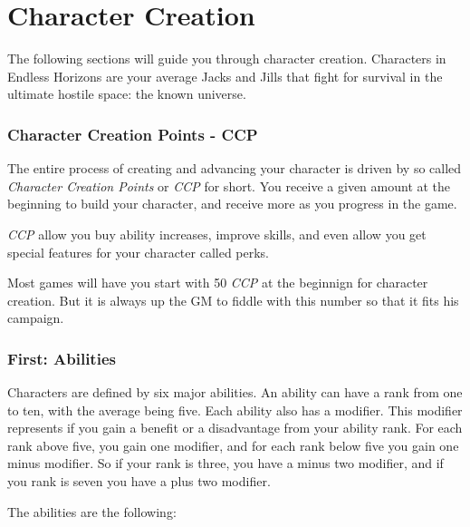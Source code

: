 \chapter{Character Creation}

The following sections will guide you through character creation. Characters
in Endless Horizons are your average Jacks and Jills that fight for survival
in the ultimate hostile space: the known universe.

\subsection{Character Creation Points - CCP}

The entire process of creating and advancing your character is driven by so
called \emph{Character Creation Points} or \emph{CCP} for short. You receive
a given amount at the beginning to build your character, and receive more as
you progress in the game.

\emph{CCP} allow you buy ability increases, improve skills, and even allow you
get special features for your character called perks.

Most games will have you start with 50 \emph{CCP} at the beginnign for character
creation. But it is always up the GM to fiddle with this number so that it fits
his campaign.

\subsection{First: Abilities}

Characters are defined by six major abilities. An ability can have a rank from
one to ten, with the average being five. Each ability also has a modifier. This
modifier represents if you gain a benefit or a disadvantage from your ability
rank. For each rank above five, you gain one modifier, and for each rank below
five you gain one minus modifier. So if your rank is three, you have a minus
two modifier, and if you rank is seven you have a plus two modifier.

The abilities are the following:

